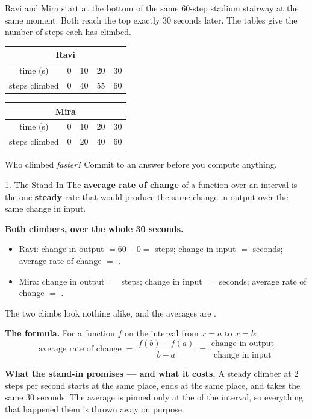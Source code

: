 \documentclass[10pt]{article}
\begin{document}
\boxguard[22]
\begin{hookbox}
Ravi and Mira start at the bottom of the same 60-step stadium stairway at the
same moment. Both reach the top exactly 30 seconds later. The tables give the
number of steps each has climbed.

\smallskip
\begin{center}
\renewcommand{\arraystretch}{1.4}
\begin{tabular}{|c|c|c|c|c|}
\hline
\multicolumn{5}{|c|}{\textbf{Ravi}} \\
\hline
time (s) & 0 & 10 & 20 & 30 \\
\hline
steps climbed & 0 & 40 & 55 & 60 \\
\hline
\end{tabular}
\hspace{0.5cm}
\begin{tabular}{|c|c|c|c|c|}
\hline
\multicolumn{5}{|c|}{\textbf{Mira}} \\
\hline
time (s) & 0 & 10 & 20 & 30 \\
\hline
steps climbed & 0 & 20 & 40 & 60 \\
\hline
\end{tabular}
\end{center}
\smallskip

Who climbed \textit{faster}? Commit to an answer before you compute anything.
\end{hookbox}

\vspace{0.1in}

\boxguard[24]
\begin{notesbox}{1. The Stand-In}
The \textbf{average rate of change} of a function over an interval is the one
\textbf{steady} rate that would produce the same change in output over the
same change in input.

\medskip
\textbf{Both climbers, over the whole 30 seconds.}

\begin{itemize}[itemsep=4pt]
  \item Ravi: change in output $= 60 - 0 = $ \blank{1.4cm} steps;
        change in input $=$ \blank{1.4cm} seconds; average rate of change
        $=$ \blank{2.6cm}.
  \item Mira: change in output $=$ \blank{1.4cm} steps; change in input
        $=$ \blank{1.4cm} seconds; average rate of change $=$ \blank{2.6cm}.
\end{itemize}

The two climbs look nothing alike, and the averages are \blank{2.2cm}.

\medskip
\textbf{The formula.} For a function $f$ on the interval from $x = a$ to
$x = b$:
\[
  \text{average rate of change} \;=\; \frac{f(b) - f(a)}{b - a}
  \;=\; \frac{\text{change in output}}{\text{change in input}}
\]

\medskip
\textbf{What the stand-in promises --- and what it costs.} A steady climber at
2 steps per second starts at the same place, ends at the same place, and takes
the same 30 seconds. The average is pinned only at the \blank{2.6cm} of the
interval, so everything that happened \blank{2.6cm} them is thrown away
on purpose.
\end{notesbox}
\end{document}
